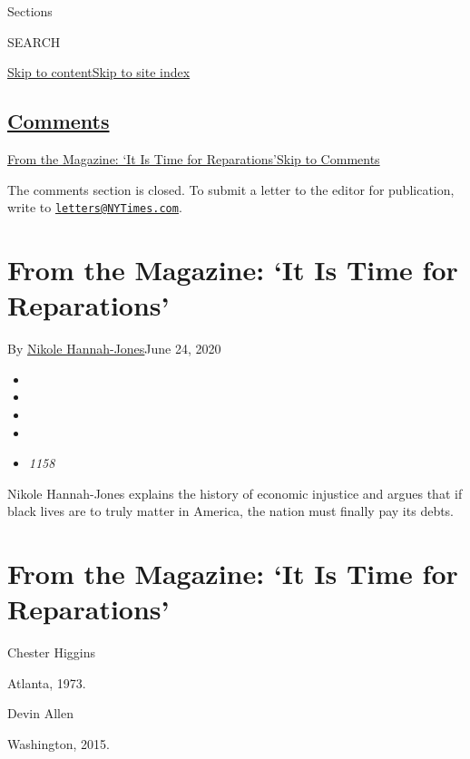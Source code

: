 Sections

SEARCH

\protect\hyperlink{site-content}{Skip to
content}\protect\hyperlink{site-index}{Skip to site index}

\hypertarget{comments}{%
\subsection{\texorpdfstring{\protect\hyperlink{commentsContainer}{Comments}}{Comments}}\label{comments}}

\href{}{From the Magazine: `It Is Time for Reparations'}\href{}{Skip to
Comments}

The comments section is closed. To submit a letter to the editor for
publication, write to
\href{mailto:letters@NYTimes.com}{\nolinkurl{letters@NYTimes.com}}.

\hypertarget{from-the-magazine-it-is-time-for-reparations}{%
\section{From the Magazine: `It Is Time for
Reparations'}\label{from-the-magazine-it-is-time-for-reparations}}

By
\href{https://www.nytimes3xbfgragh.onion/by/nikole-hannah-jones}{Nikole
Hannah-Jones}June 24, 2020

\begin{itemize}
\item
\item
\item
\item
\item
  \emph{1158}
\end{itemize}

Nikole Hannah-Jones explains the history of economic injustice and
argues that if black lives are to truly matter in America, the nation
must finally pay its debts.

\hypertarget{from-the-magazine-it-is-time-for-reparations-1}{%
\section{From the Magazine: `It Is Time for
Reparations'}\label{from-the-magazine-it-is-time-for-reparations-1}}

Chester Higgins

Atlanta, 1973.

Devin Allen

Washington, 2015.

